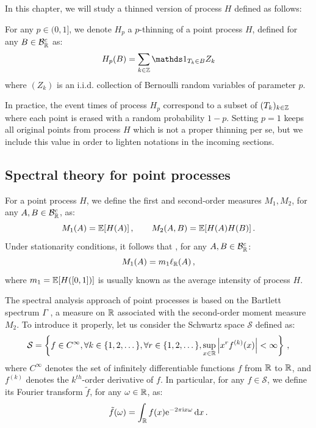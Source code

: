 In this chapter, we will study a thinned version of process $H$ defined as follows:
\begin{definition}\label{def:chap5_thinning}
For any $p\in(0,1]$, we denote $H_p$ a $p$-thinning of a point process $H$, defined for any $B\in\mathcal{B}_{{\mathbb R}}^c$ as:
\[H_p(B) = \sum_{k\in\ZZ}{\II_{T_k \in B} Z_k}\]
where $(Z_k)$ is an i.i.d. collection of Bernoulli random variables of parameter $p$.
\end{definition}

In practice, the event times of process $H_p$ correspond to a subset of $(T_k)_{k\in{\mathbb Z}}$ where each point
is erased with a random probability $1-p$. 
Setting $p = 1$ keeps all original points from process $H$ which is not a proper thinning per se,
but we include this value in order to lighten notations in the incoming sections. 

\subsection{Spectral theory for point processes}\label{sec:chap5_spectral_theory}

For a point process $H$, we define the first and second-order measures $M_1, M_2$, for any $A, B\in\mathcal{B}_{{\mathbb R}}^c$, as:
\[M_1(A) = {\mathbb E}[H(A)]\,,\qquad M_2(A,B) = {\mathbb E}[H(A)H(B)]\,.\]
Under stationarity conditions, it follows that \parencite[Proposition 8.1.I]{DaleyV1}, for any $A, B\in\mathcal{B}_{{\mathbb R}}^c$:
\[M_1(A) = m_1 \ell_{{\mathbb R}}(A)\,,\]
where $m_1 = {\mathbb E}[H([0,1])]$ is usually known as the average intensity of process $H$.

The spectral analysis approach of point processes is based on the Bartlett spectrum $\Gamma$ \parencite{Bartlett1963}, 
a measure on ${\mathbb R}$ associated with the second-order moment measure $M_2$. 
To introduce it properly, let us consider the Schwartz space $\mathcal{S}$ defined as:
\[
    \mathcal S = \left\{ f \in C^\infty, \forall k \in \{1, 2, \dots\}, \forall r \in \{1, 2, \dots\},
    \sup_{x \in {\mathbb R}} \left| x^r
    f^{(k)}(x)
    \right| < \infty \right\}\,,
\] where $C^\infty$ denotes the set of infinitely differentiable functions $f$ from ${\mathbb R}$ to ${\mathbb R}$, 
and $f^{(k)}$ denotes the $k^{th}$-order derivative of $f$.
In particular, for any $f\in\mathcal{S}$, we define its Fourier transform $\tilde f$, for any $\omega\in{\mathbb R}$, as:
\[\tilde f (\omega) = \int_{{\mathbb R}}{f(x) \mathrm{e}^{-2\pi\mathrm{i} x \omega}\,{\mathrm{d}} x}\,.\]

